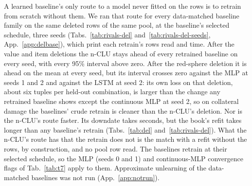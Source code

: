 \documentclass{article} %
\begin{document}
A learned baseline's only route to a model never fitted on the rows is to retrain from scratch without them. We ran
that route for every data-matched baseline family on the same deleted rows of the same %
pool, at the baseline's selected schedule, three seeds (Tabs.~\ref{tab:rivals-del}
and~\ref{tab:rivals-del-seeds}, App.~\ref{app:delbase}), which print each retrain's rows read %
and time. After the value and item deletions the n-CLU stays ahead of every %
retrained baseline on every seed, with every 95\% interval above %
zero. After the red-sphere deletion it is ahead on the mean at every seed, but its interval crosses
zero against the MLP at seeds 1 and 2 and against the LSTM at seed 2: %
its own loss on that deletion, about six tuples per held-out combination, is larger than the %
change any retrained baseline shows except the continuous MLP at seed 2, so on %
collateral damage the baselines' crude retrain is cleaner than the n-CLU's deletion. Nor is the
n-CLU's route faster. Its downdate takes seconds, but the book's refit takes longer %
than any baseline's retrain (Tabs.~\ref{tab:del} and~\ref{tab:rivals-del}). What the n-CLU's route has that the retrain does not %
is the match with a refit without the rows, by construction, and no pool row read. The baselines
retrain at their selected schedule, so the MLP (seeds 0 and 1) and continuous-MLP convergence flags
of Tab.~\ref{tab:t7} apply to them. Approximate unlearning of the data-matched baselines was not
run (App.~\ref{app:notrun}).
\end{document}
